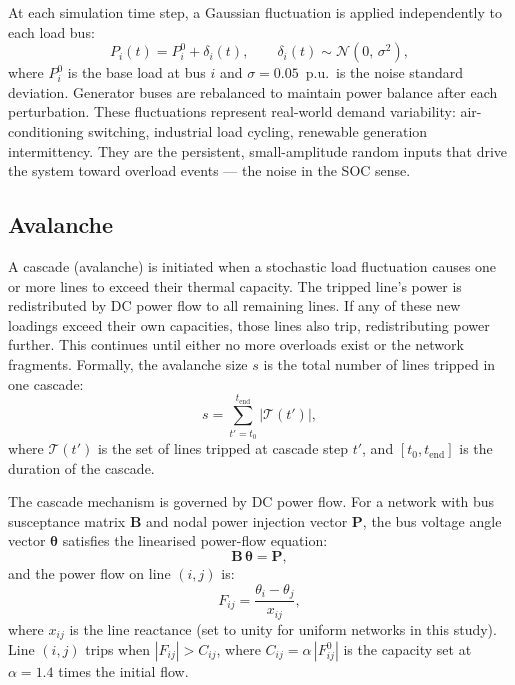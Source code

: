 \documentclass[12pt,a4paper]{article}
\begin{document}
At each simulation time step, a Gaussian fluctuation is applied
independently to each load bus:
\begin{equation}
    P_i(t) = P_i^0 + \delta_i(t), \qquad
    \delta_i(t) \sim \mathcal{N}(0,\, \sigma^2),
    \label{eq:noise}
\end{equation}
where $P_i^0$ is the base load at bus $i$ and $\sigma = 0.05$~p.u.\ is
the noise standard deviation. Generator buses are rebalanced to
maintain power balance after each perturbation. These fluctuations
represent real-world demand variability: air-conditioning switching,
industrial load cycling, renewable generation intermittency. They
are the persistent, small-amplitude random inputs that drive the system
toward overload events — the noise in the SOC sense.

\subsection{Avalanche}

A cascade (avalanche) is initiated when a stochastic load fluctuation
causes one or more lines to exceed their thermal capacity. The tripped
line's power is redistributed by DC power flow to all remaining lines.
If any of these new loadings exceed their own capacities, those lines
also trip, redistributing power further. This continues until either
no more overloads exist or the network fragments. Formally, the
avalanche size $s$ is the total number of lines tripped in one cascade:
\begin{equation}
    s = \sum_{t'=t_0}^{t_\text{end}} \left|\mathcal{T}(t')\right|,
    \label{eq:avl}
\end{equation}
where $\mathcal{T}(t')$ is the set of lines tripped at cascade step
$t'$, and $[t_0, t_\text{end}]$ is the duration of the cascade.

The cascade mechanism is governed by DC power flow. For a network with
bus susceptance matrix $\mathbf{B}$ and nodal power injection vector
$\mathbf{P}$, the bus voltage angle vector $\boldsymbol{\theta}$
satisfies the linearised power-flow equation:
\begin{equation}
    \mathbf{B}\,\boldsymbol{\theta} = \mathbf{P},
    \label{eq:dcpf}
\end{equation}
and the power flow on line $(i,j)$ is:
\begin{equation}
    F_{ij} = \frac{\theta_i - \theta_j}{x_{ij}},
    \label{eq:lineflow}
\end{equation}
where $x_{ij}$ is the line reactance (set to unity for uniform
networks in this study). Line $(i,j)$ trips when
$|F_{ij}| > C_{ij}$, where $C_{ij} = \alpha\,|F_{ij}^0|$ is the
capacity set at $\alpha = 1.4$ times the initial flow.
\end{document}

